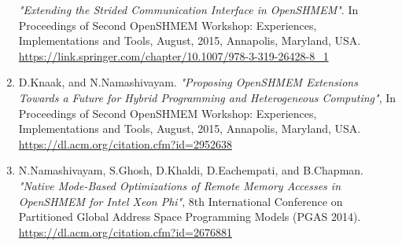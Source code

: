 \begin{enumerate}
      \textit{"Extending the Strided Communication Interface in OpenSHMEM"}. In
      Proceedings of Second OpenSHMEM Workshop: Experiences, Implementations and
      Tools, August, 2015, Annapolis, Maryland, USA.\\
      \url{https://link.springer.com/chapter/10.1007/978-3-319-26428-8_1}
\item D.Knaak, and N.Namashivayam.
      \textit{"Proposing OpenSHMEM Extensions Towards a Future for Hybrid
      Programming and Heterogeneous Computing"}, In Proceedings of Second
      OpenSHMEM Workshop: Experiences, Implementations and Tools, August, 2015,
      Annapolis, Maryland, USA.\\
      \url{https://dl.acm.org/citation.cfm?id=2952638}
\item N.Namashivayam, S.Ghosh, D.Khaldi, D.Eachempati, and
      B.Chapman.
      \textit{"Native Mode-Based Optimizations of Remote Memory Accesses in
      OpenSHMEM for Intel Xeon Phi"}, 8th International Conference on Partitioned
      Global Address Space Programming Models (PGAS 2014).\\
      \url{https://dl.acm.org/citation.cfm?id=2676881}
\end{enumerate}


